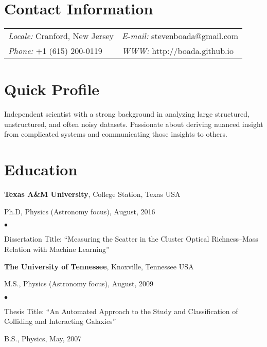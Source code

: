 \documentclass[margin,line, 11pt]{res}
\newenvironment{list1}{
  \begin{list}{\ding{113}}{%
      \setlength{\itemsep}{0in}
      \setlength{\parsep}{0in} \setlength{\parskip}{0in}
      \setlength{\topsep}{0in} \setlength{\partopsep}{0in} 
      \setlength{\leftmargin}{0.17in}}}{\end{list}}
\newenvironment{list2}{
  \begin{list}{$\bullet$}{%
      \setlength{\itemsep}{0in}
      \setlength{\parsep}{0in} \setlength{\parskip}{0in}
      \setlength{\topsep}{0in} \setlength{\partopsep}{0in} 
      \setlength{\leftmargin}{0.2in}}}{\end{list}}
\begin{document}

\begin{resume}
\section{Contact Information}
\begin{tabular}{@{}p{3in}p{3in}}
\textit{Locale:} Cranford, New Jersey & \textit{E-mail:} stevenboada@gmail.com \\            
\textit{Phone:} +1 (615) 200-0119   & \textit{WWW:} http://boada.github.io \\             
\end{tabular}
\vspace*{-4mm}

\section{Quick Profile}
Independent scientist with a strong background in analyzing large structured, unstructured, and often noisy datasets. Passionate about deriving nuanced insight from complicated systems and communicating those insights to others. 
\vspace*{-5mm}

\section{Education}
\textbf{Texas A\&M University}, College Station, Texas USA\\
\vspace*{-5mm}
\begin{list1}
	\item[]Ph.D, Physics (Astronomy focus), August, 2016
	\begin{list2}
		\item Dissertation Title: ``Measuring the Scatter in the Cluster Optical Richness--Mass Relation with Machine Learning'' 
	\end{list2}
\end{list1}
\vspace*{-5mm}

\textbf{The University of Tennessee}, Knoxville, Tennessee USA\\
\vspace*{-5mm}
\begin{list1}
	\item[] M.S., Physics (Astronomy focus),  August, 2009
	\begin{list2}
		\item Thesis Title: ``An Automated Approach to the Study and Classification of Colliding and Interacting Galaxies''
	\end{list2}
	\item[] B.S., Physics,  May, 2007
\end{list1}
\vspace*{-5mm}


\end{resume}
\end{document}
